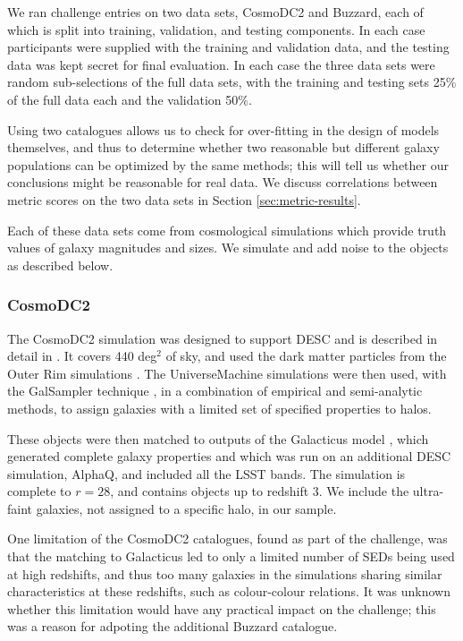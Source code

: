 \documentclass[twocolumn,twocolappendix]{aastex63}
\begin{document}
We ran challenge entries on two data sets, CosmoDC2 and Buzzard, each of which is split into training, 
validation, and testing components.  In each case participants were supplied with the training and 
validation data, and the testing data was kept secret for final evaluation. In each case the three
data sets were random sub-selections of the full data sets, with the training and testing sets 25\% of 
the full data each and the validation 50\%. 

Using two catalogues allows us to check
for over-fitting in the design of models themselves, and thus to determine whether two
reasonable but different galaxy populations can be optimized by the same methods; this will
tell us whether our conclusions might be reasonable for real data. We discuss correlations
between metric scores on the two data sets in Section \ref{sec:metric-results}.

Each of these data sets come from cosmological simulations which provide truth values of galaxy magnitudes
and sizes.  We simulate and add noise to the objects as described below.

\subsubsection{CosmoDC2} \label{sec:cosmodc2}

The CosmoDC2 simulation was designed to support DESC and 
is described in detail in \citet{cosmodc2}.  It covers 440
deg${}^2$ of sky, and used the dark matter particles from the Outer Rim
simulations \citep{outer_rim}.  The UniverseMachine \citep{universe_machine}
simulations were then used, with the GalSampler technique \citep{galsampler},
in a combination of empirical and semi-analytic
methods, to assign galaxies with a limited set of specified properties to halos.

These objects were then matched to outputs of the Galacticus model
\citep{galacticus}, which generated complete galaxy properties and which was run
on an additional DESC simulation, AlphaQ, and included all the LSST bands.  The
simulation is complete to $r=28$, and contains objects up to redshift 3.  We
include the ultra-faint galaxies, not assigned to a specific halo, in our sample.

One limitation of the CosmoDC2 catalogues, found as part of the challenge,
was that the matching to Galacticus led to only a limited number of SEDs being
used at high redshifts, and thus too many galaxies in the simulations sharing
similar characteristics at these redshifts, such as colour-colour relations.
It was unknown whether this limitation would have any practical impact on the challenge;
this was a reason for adpoting the additional Buzzard catalogue.
\end{document}
